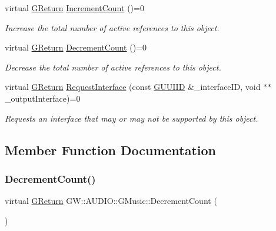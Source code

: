 \begin{DoxyCompactItemize}
virtual \mbox{\hyperlink{namespace_g_w_a67a839e3df7ea8a5c5686613a7a3de21}{G\+Return}} \mbox{\hyperlink{class_g_w_1_1_a_u_d_i_o_1_1_g_music_a22d7a170b4d307e5398ebb92f950431f}{Increment\+Count}} ()=0
\begin{DoxyCompactList}\small\item\em Increase the total number of active references to this object. \end{DoxyCompactList}\item 
virtual \mbox{\hyperlink{namespace_g_w_a67a839e3df7ea8a5c5686613a7a3de21}{G\+Return}} \mbox{\hyperlink{class_g_w_1_1_a_u_d_i_o_1_1_g_music_a1385376fffc42c40f5922b4722d10b5c}{Decrement\+Count}} ()=0
\begin{DoxyCompactList}\small\item\em Decrease the total number of active references to this object. \end{DoxyCompactList}\item 
virtual \mbox{\hyperlink{namespace_g_w_a67a839e3df7ea8a5c5686613a7a3de21}{G\+Return}} \mbox{\hyperlink{class_g_w_1_1_a_u_d_i_o_1_1_g_music_a45b07d7915cfe61ab27338c42b78dcfb}{Request\+Interface}} (const \mbox{\hyperlink{struct_g_w_1_1_g_u_u_i_i_d}{G\+U\+U\+I\+ID}} \&\+\_\+interface\+ID, void $\ast$$\ast$\+\_\+output\+Interface)=0
\begin{DoxyCompactList}\small\item\em Requests an interface that may or may not be supported by this object. \end{DoxyCompactList}\end{DoxyCompactItemize}


\subsection{Member Function Documentation}
\mbox{\label{class_g_w_1_1_a_u_d_i_o_1_1_g_music_a1385376fffc42c40f5922b4722d10b5c}} 
\subsubsection{\texorpdfstring{Decrement\+Count()}{DecrementCount()}}
{\footnotesize\ttfamily virtual \mbox{\hyperlink{namespace_g_w_a67a839e3df7ea8a5c5686613a7a3de21}{G\+Return}} G\+W\+::\+A\+U\+D\+I\+O\+::\+G\+Music\+::\+Decrement\+Count (\begin{DoxyParamCaption}{ }\end{DoxyParamCaption})\hspace{0.3cm}{\ttfamily [pure virtual]}}



